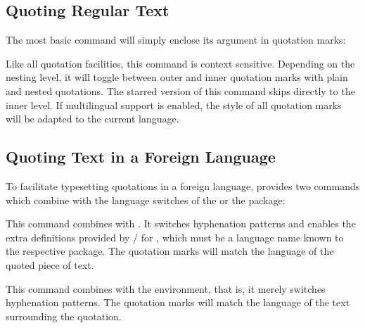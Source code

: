 \documentclass{ltxdockit}[2010/09/26]
\begin{document}
\subsection{Quoting Regular Text}
\label{bas:reg}

The most basic command will simply enclose its argument in quotation marks:

\begin{ltxsyntax}


Like all quotation facilities, this command is context sensitive. Depending on the nesting level, it will toggle between outer and inner quotation marks with plain and nested quotations. The starred version of this command skips directly to the inner level. If multilingual support is enabled, the style of all quotation marks will be adapted to the current language.

\end{ltxsyntax}

\subsection{Quoting Text in a Foreign Language}
\label{bas:bbl}

To facilitate typesetting quotations in a foreign language,  provides two commands which combine  with the language switches of the  or the  package:

\begin{ltxsyntax}


This command combines  with . It switches hyphenation patterns and enables the extra definitions provided by \slash{} for , which must be a language name known to the respective package. The quotation marks will match the language of the quoted piece of text.


This command combines  with the  environment, that is, it merely switches hyphenation patterns. The quotation marks will match the language of the text surrounding the quotation.

\end{ltxsyntax}
\end{document}
